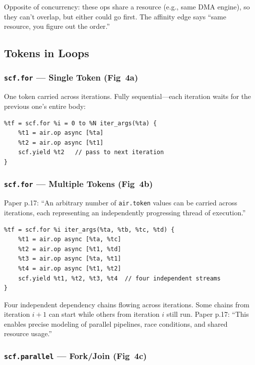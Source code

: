 \documentclass[11pt,a4paper]{article}
\begin{document}
Opposite of concurrency: these ops share a resource (e.g., same DMA engine), so
they can't overlap, but either could go first. The affinity edge says ``same
resource, you figure out the order.''

\subsection{Tokens in Loops}

\subsubsection{\texttt{scf.for} --- Single Token (Fig~4a)}

One token carried across iterations. Fully sequential---each iteration waits for
the previous one's entire body:

\begin{lstlisting}
%tf = scf.for %i = 0 to %N iter_args(%ta) {
    %t1 = air.op async [%ta]
    %t2 = air.op async [%t1]
    scf.yield %t2   // pass to next iteration
}
\end{lstlisting}

\subsubsection{\texttt{scf.for} --- Multiple Tokens (Fig~4b)}

Paper p.17: ``An arbitrary number of \texttt{air.token} values can be carried
across iterations, each representing an independently progressing thread of
execution.''

\begin{lstlisting}
%tf = scf.for %i iter_args(%ta, %tb, %tc, %td) {
    %t1 = air.op async [%ta, %tc]
    %t2 = air.op async [%t1, %td]
    %t3 = air.op async [%ta, %t1]
    %t4 = air.op async [%t1, %t2]
    scf.yield %t1, %t2, %t3, %t4  // four independent streams
}
\end{lstlisting}

Four independent dependency chains flowing across iterations. Some chains from
iteration $i{+}1$ can start while others from iteration $i$ still run. Paper p.17:
``This enables precise modeling of parallel pipelines, race conditions, and shared
resource usage.''

\subsubsection{\texttt{scf.parallel} --- Fork/Join (Fig~4c)}
\end{document}
